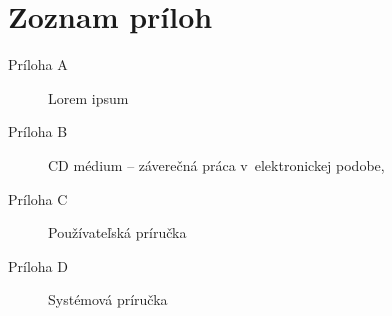 \chapter*{Zoznam príloh}

\begin{description}
	\item[Príloha A] Lorem ipsum
    \item[Príloha B] CD médium -- záverečná práca v~elektronickej podobe,
    \item[Príloha C] Používateľská príručka
    \item[Príloha D] Systémová príručka
\end{description}


